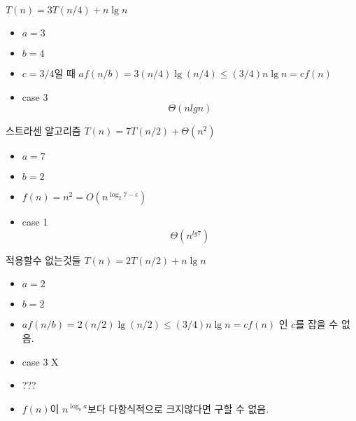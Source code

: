 \documentclass[10pt]{beamer}
\begin{document}
\begin{frame}{ex}
    $T(n) = 3T(n/4) + n\lg n$
    \begin{itemize}
        \item $a = 3$
        \item $b = 4$
        \item $c = 3/4$일 때 $af(n/b) = 3(n/4) \lg(n/4) \le (3/4)n \lg n = cf(n)$
        \item case 3
        $$\Theta(nlg n)$$
    \end{itemize}
\end{frame}


\begin{frame}{스트라센 알고리즘}
    $T(n) = 7T(n/2) + \Theta(n^2)$

    \begin{itemize}
        \item $a = 7$
        \item $b = 2$
        \item $f(n) = n^2 = O(n ^{\log _2 7 - \epsilon})$
        \item case 1
        $$\Theta(n^{lg 7})$$
    \end{itemize}
\end{frame}


\begin{frame}{적용할수 없는것들}
    $T(n) = 2T(n/2) + n\lg n$
    \begin{itemize}
        \item $a = 2$
        \item $b = 2$
        \item $af(n/b) = 2(n/2) \lg(n/2) \le (3/4)n \lg n = cf(n)$ 인 $c$를 잡을 수 없음.
        \item case 3 X
        \item ???
        \item $f(n)$이 $n^{\log_b a}$보다 다항식적으로 크지않다면 구할 수 없음.
    \end{itemize}
\end{frame}



\end{document}
